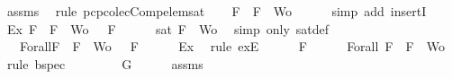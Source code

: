 \begin{isabellebody}
\ assms{\isacharparenleft}{}{\isacharcomma}{}{\isacharcomma}{}{\isacharcomma}{}{\isacharparenright}\ \isamarkupfalse%
\ {\isacharparenleft}rule\ pcp{\isacharunderscore}colecComp{\isacharunderscore}elem{\isacharunderscore}sat{\isacharparenright}\isanewline
\ \ \isamarkupfalse%
\ {\isachardoublequoteopen}F\ {\isasymin}\ {\isacharbraceleft}F{\isacharbraceright}\ {\isasymunion}\ Wo{\isachardoublequoteclose}\isanewline
\ \ \ \ \isamarkupfalse%
\ {\isacharparenleft}simp\ add{\isacharcolon}\ insertI{}{\isacharparenright}\isanewline
\ \ \isamarkupfalse%
\ Ex{}{\isacharcolon}{\isachardoublequoteopen}{\isasymexists}{\isasymA}{\isachardot}\ {\isasymforall}F\ {\isasymin}\ {\isacharparenleft}{\isacharbraceleft}F{\isacharbraceright}\ {\isasymunion}\ Wo{\isacharparenright}{\isachardot}\ {\isasymA}\ {\isasymTurnstile}\ F{\isachardoublequoteclose}\isanewline
\ \ \ \ \isamarkupfalse%
\ {\isacartoucheopen}sat\ {\isacharparenleft}{\isacharbraceleft}F{\isacharbraceright}\ {\isasymunion}\ Wo{\isacharparenright}{\isacartoucheclose}\ \isamarkupfalse%
\ {\isacharparenleft}simp\ only{\isacharcolon}\ sat{\isacharunderscore}def{\isacharparenright}\isanewline
\ \ \isamarkupfalse%
\ {\isasymA}\ \ Forall{}{\isacharcolon}{\isachardoublequoteopen}{\isasymforall}F\ {\isasymin}\ {\isacharparenleft}{\isacharbraceleft}F{\isacharbraceright}\ {\isasymunion}\ Wo{\isacharparenright}{\isachardot}\ {\isasymA}\ {\isasymTurnstile}\ F{\isachardoublequoteclose}\isanewline
\ \ \ \ \isamarkupfalse%
\ Ex{}\ \isamarkupfalse%
\ {\isacharparenleft}rule\ exE{\isacharparenright}\isanewline
\ \ \isamarkupfalse%
\ {\isachardoublequoteopen}{\isasymA}\ {\isasymTurnstile}\ F{\isachardoublequoteclose}\isanewline
\ \ \ \ \isamarkupfalse%
\ Forall{}\ {\isacartoucheopen}F\ {\isasymin}\ {\isacharbraceleft}F{\isacharbraceright}\ {\isasymunion}\ Wo{\isacartoucheclose}\ \isamarkupfalse%
\ {\isacharparenleft}rule\ bspec{\isacharparenright}\isanewline
\ \ \isamarkupfalse%
\ \isamarkupfalse%
\ {\isachardoublequoteopen}{\isasymA}\ {\isasymTurnstile}\ \isactrlbold {\isasymnot}{\isacharparenleft}\isactrlbold {\isasymnot}\ G{\isacharparenright}{\isachardoublequoteclose}\isanewline
\ \ \ \ \isamarkupfalse%
\ assms{\isacharparenleft}{}{\isacharparenright}\ \isamarkupfalse%

\end{isabellebody}
